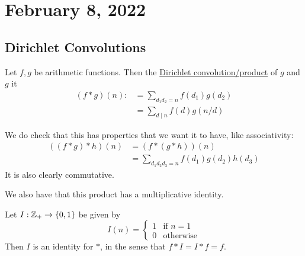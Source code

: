\section{February 8, 2022}

\subsection{Dirichlet Convolutions}

\begin{definition}
    Let $f, g$ be arithmetic functions. Then the \ul{Dirichlet convolution/product} of $g$ and $g$ it
    \begin{align*}
        (f * g)(n) : & = \sum_{d_1d_2=n}f(d_1)g(d_2) \\
                     & = \sum_{d\mid n}f(d) g(n/d)
    \end{align*}
\end{definition}

We do check that this has properties that we want it to have, like associativity:
\begin{align*}
    ((f * g) * h)(n) & = (f * (g * h))(n)                      \\
                     & = \sum_{d_1d_2d_3=n} f(d_1)g(d_2)h(d_3)
\end{align*}
It is also clearly commutative.

We also have that this product has a multiplicative identity.

\begin{definition}
    Let $I : \mathbb Z_+\to \{0, 1\}$ be given by
    \[I(n) = \begin{cases}
            1 & \text{if } n = 1 \\
            0 & \text{otherwise}
        \end{cases}\]
    Then $I$ is an identity for $*$, in the sense that $f * I = I * f = f$.
\end{definition}


